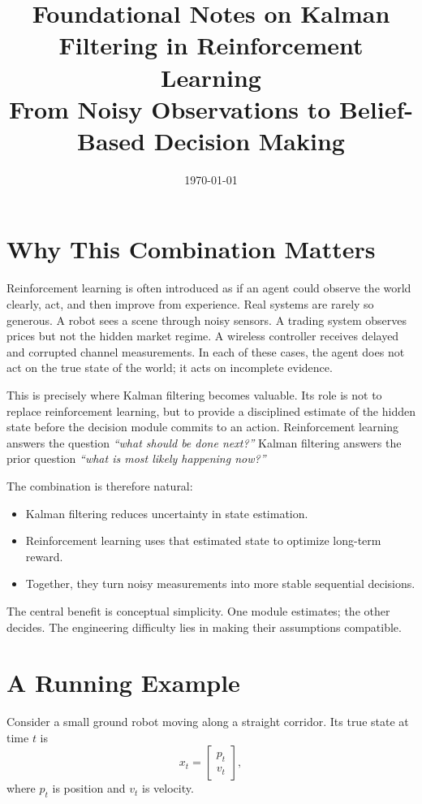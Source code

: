 \documentclass[12pt,a4paper]{article}
\title{Foundational Notes on Kalman Filtering in Reinforcement Learning\\
\large From Noisy Observations to Belief-Based Decision Making}
\author{}
\date{\today}
\begin{document}
\maketitle
\tableofcontents

\section{Why This Combination Matters}

Reinforcement learning is often introduced as if an agent could observe the world clearly, act, and then improve from experience. Real systems are rarely so generous. A robot sees a scene through noisy sensors. A trading system observes prices but not the hidden market regime. A wireless controller receives delayed and corrupted channel measurements. In each of these cases, the agent does not act on the true state of the world; it acts on incomplete evidence.

This is precisely where Kalman filtering becomes valuable. Its role is not to replace reinforcement learning, but to provide a disciplined estimate of the hidden state before the decision module commits to an action. Reinforcement learning answers the question
\emph{``what should be done next?''}
Kalman filtering answers the prior question
\emph{``what is most likely happening now?''}

The combination is therefore natural:
\begin{itemize}
  \item Kalman filtering reduces uncertainty in state estimation.
  \item Reinforcement learning uses that estimated state to optimize long-term reward.
  \item Together, they turn noisy measurements into more stable sequential decisions.
\end{itemize}

The central benefit is conceptual simplicity. One module estimates; the other decides. The engineering difficulty lies in making their assumptions compatible.

\section{A Running Example}

Consider a small ground robot moving along a straight corridor. Its true state at time \(t\) is
\[
x_t =
\begin{bmatrix}
p_t\\
v_t
\end{bmatrix},
\]
where \(p_t\) is position and \(v_t\) is velocity.
\end{document}
